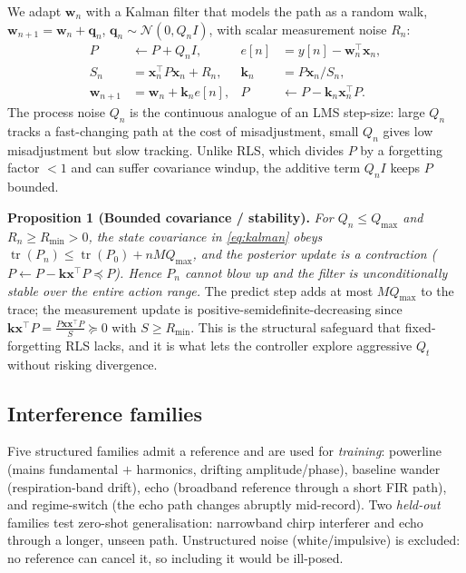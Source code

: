 \documentclass[journal]{IEEEtran}
\begin{document}
We adapt $\mathbf{w}_n$ with a Kalman filter that models the path as a random
walk, $\mathbf{w}_{n+1}=\mathbf{w}_n+\bm{q}_n$, $\bm{q}_n\!\sim\!\mathcal{N}(0,Q_nI)$,
with scalar measurement noise $R_n$:
\begin{equation}
\begin{aligned}
  P &\leftarrow P + Q_n I, &
  e[n] &= y[n]-\mathbf{w}_n^{\top}\mathbf{x}_n,\\
  S_n &= \mathbf{x}_n^{\top}P\mathbf{x}_n + R_n, &
  \mathbf{k}_n &= P\mathbf{x}_n/S_n,\\
  \mathbf{w}_{n+1} &= \mathbf{w}_n+\mathbf{k}_n e[n], &
  P &\leftarrow P-\mathbf{k}_n\mathbf{x}_n^{\top}P.
\end{aligned}
\label{eq:kalman}
\end{equation}
The process noise $Q_n$ is the continuous analogue of an LMS step-size: large
$Q_n$ tracks a fast-changing path at the cost of misadjustment, small $Q_n$
gives low misadjustment but slow tracking. Unlike RLS, which divides $P$ by a
forgetting factor $<1$ and can suffer covariance windup, the additive term
$Q_nI$ keeps $P$ bounded.

\smallskip
\noindent\textbf{Proposition 1 (Bounded covariance / stability).}
\emph{For $Q_n\!\le\!Q_{\max}$ and $R_n\!\ge\!R_{\min}\!>\!0$, the state
covariance in \eqref{eq:kalman} obeys
$\operatorname{tr}(P_{n})\le \operatorname{tr}(P_{0})+nMQ_{\max}$, and the
posterior update is a contraction ($P\!\leftarrow\!P-\mathbf{k}\mathbf{x}^{\top}P\preceq P$).
Hence $P_n$ cannot blow up and the filter is unconditionally stable over the
entire action range.}
The predict step adds at most $MQ_{\max}$ to the trace; the measurement update
is positive-semidefinite-decreasing since
$\mathbf{k}\mathbf{x}^{\top}P=\tfrac{P\mathbf{x}\mathbf{x}^{\top}P}{S}\succeq0$
with $S\!\ge\!R_{\min}$. This is the structural safeguard that fixed-forgetting
RLS lacks, and it is what lets the controller explore aggressive $Q_t$ without
risking divergence.

\subsection{Interference families}
Five structured families admit a reference and are used for
\emph{training}: powerline (mains fundamental $+$ harmonics, drifting
amplitude/phase), baseline wander (respiration-band drift), echo (broadband
reference through a short FIR path), and regime-switch (the echo path changes
abruptly mid-record). Two \emph{held-out} families test zero-shot
generalisation: narrowband chirp interferer and echo through a longer,
unseen path. Unstructured noise (white/impulsive) is excluded: no reference can
cancel it, so including it would be ill-posed.
\end{document}
